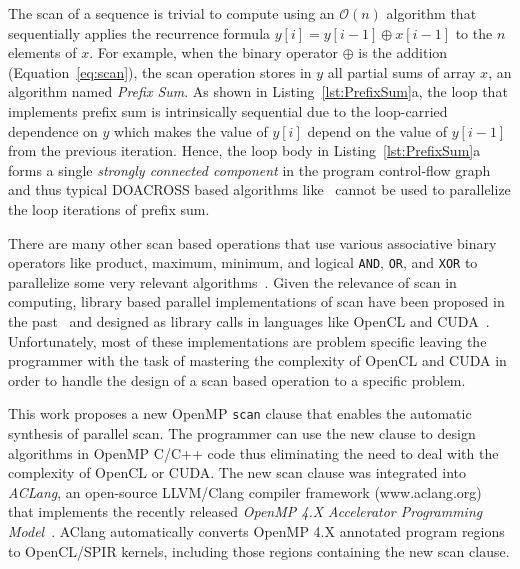 \documentclass[Ingles]{ic-tese-v1}
\newcommand{\req}[1]{Equation~\ref{eq:#1}}
\newcommand{\rlsts}[2]{Listing~\ref{lst:#1}{#2}}
\begin{document}
The scan of a sequence is trivial to compute using an $\mathcal{O}(n)$
algorithm   that   sequentially   applies   the   recurrence   formula
$y[i]  = y[i-1]  \oplus  x[i-1]$  to the  $n$  elements  of $x$.   For
example,   when  the   binary  operator   $\oplus$  is   the  addition
(\req{scan}), the  scan operation  stores in $y$  all partial  sums of
array  $x$,  an algorithm  named  \textit{Prefix  Sum}.  As  shown  in
\rlsts{PrefixSum}{a}, the  loop   that  implements   prefix  sum   is
intrinsically  sequential due  to the  loop-carried dependence  on $y$
which makes the  value of $y[i]$ depend on the  value of $y[i-1]$ from
the previous  iteration. Hence,  the loop body  in \rlsts{PrefixSum}{a}
forms a  single \textit{strongly  connected component} in  the program
control-flow  graph~\cite{flowgraph} and  thus typical  DOACROSS based
algorithms like~\cite{926166,344315} cannot  be used  to parallelize
the loop iterations of prefix sum.

There are many  other scan based operations that use various
associative  binary  operators  like product,  maximum,  minimum,  and
logical  \texttt{AND}, \texttt{OR},  and  \texttt{XOR} to  parallelize
some                           very                           relevant
algorithms~\cite{NEEDLEMAN1970443,Crow:1984:STT:800031.808600,minimum}.
Given  the relevance  of  scan in  computing,  library based  parallel
implementations    of    scan    have    been    proposed    in    the
past~\cite{dataparallel,  ScanAsPrimitive}  and  designed  as  library
calls   in  languages   like   OpenCL  and   CUDA~\cite{Sengupta:2007,
	Capannini:2011}.   Unfortunately, most  of these  implementations are
problem specific leaving the programmer with the task of mastering the
complexity of OpenCL and CUDA in order  to handle the design of a scan
based operation to a specific problem.

This work proposes a new OpenMP \texttt{scan} clause that enables the
automatic synthesis of parallel  scan.  The programmer can
use the new  clause to  design algorithms in OpenMP C/C++ code
thus eliminating the need to deal with  the complexity of OpenCL or CUDA.
The  new   scan  clause   was  integrated  into   \textit{ACLang},  an
open-source LLVM/Clang compiler framework (www.aclang.org) that
implements  the  recently   released  \textit{OpenMP  4.X  Accelerator
	Programming   Model}~\cite{MPereira2017}.     AClang   automatically
converts OpenMP 4.X annotated program regions to OpenCL/SPIR kernels,
including those regions containing the new scan clause.
\end{document}
